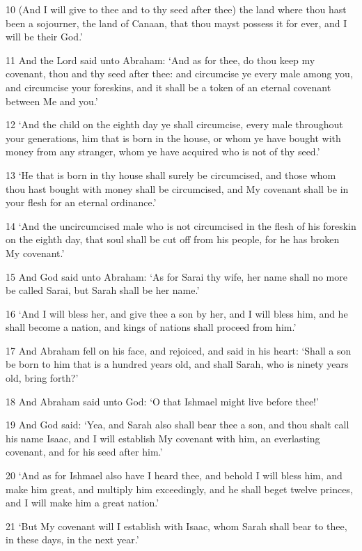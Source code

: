 \par 10 (And I will give to thee and to thy seed after thee) the land where thou hast been a sojourner, the land of Canaan, that thou mayst possess it for ever, and I will be their God.’
\par 11 And the Lord said unto Abraham: ‘And as for thee, do thou keep my covenant, thou and thy seed after thee: and circumcise ye every male among you, and circumcise your foreskins, and it shall be a token of an eternal covenant between Me and you.’
\par 12 ‘And the child on the eighth day ye shall circumcise, every male throughout your generations, him that is born in the house, or whom ye have bought with money from any stranger, whom ye have acquired who is not of thy seed.’
\par 13 ‘He that is born in thy house shall surely be circumcised, and those whom thou hast bought with money shall be circumcised, and My covenant shall be in your flesh for an eternal ordinance.’
\par 14 ‘And the uncircumcised male who is not circumcised in the flesh of his foreskin on the eighth day, that soul shall be cut off from his people, for he has broken My covenant.’
\par 15 And God said unto Abraham: ‘As for Sarai thy wife, her name shall no more be called Sarai, but Sarah shall be her name.’
\par 16 ‘And I will bless her, and give thee a son by her, and I will bless him, and he shall become a nation, and kings of nations shall proceed from him.’
\par 17 And Abraham fell on his face, and rejoiced, and said in his heart: ‘Shall a son be born to him that is a hundred years old, and shall Sarah, who is ninety years old, bring forth?’
\par 18 And Abraham said unto God: ‘O that Ishmael might live before thee!’
\par 19 And God said: ‘Yea, and Sarah also shall bear thee a son, and thou shalt call his name Isaac, and I will establish My covenant with him, an everlasting covenant, and for his seed after him.’
\par 20 ‘And as for Ishmael also have I heard thee, and behold I will bless him, and make him great, and multiply him exceedingly, and he shall beget twelve princes, and I will make him a great nation.’
\par 21 ‘But My covenant will I establish with Isaac, whom Sarah shall bear to thee, in these days, in the next year.’
